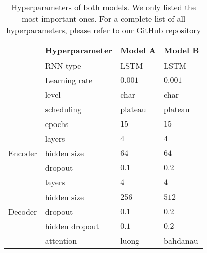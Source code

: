 \documentclass[11pt,a4paper]{article}
\begin{document}
\begin{table}[ht]
    \centering
    \caption{Hyperparameters of both models. We only listed the most important ones. For a complete list of all hyperparameters, please refer to our GitHub repository}
    \hspace*{-9mm} %
    \begin{tabular}{ll|l|l}
                             & \textbf{Hyperparameter} & \textbf{Model A} & \textbf{Model B} \\\hline
                             & RNN type       & LSTM     & LSTM    \\
                             & Learning rate  & $0.001$  & $0.001$ \\
                             & level          & char     & char    \\
                             & scheduling     & plateau  & plateau \\
                             & epochs         & $15$     & $15$      \\\hline
    \multirow{3}{*}{Encoder} & layers         & $4$      & $4$       \\
                             & hidden size    & $64$     & $64$      \\
                             & dropout        & $0.1$    & $0.2$     \\\hline
    \multirow{5}{*}{Decoder} & layers         & $4$      & $4$       \\
                             & hidden size    & $256$    & $512$     \\
                             & dropout        & $0.1$    & $0.2$     \\
                             & hidden dropout & $0.1$    & $0.2$     \\
                             & attention      & luong    & bahdanau  \\    
    \end{tabular}
    \label{tab:parameters}
\end{table}
\end{document}
